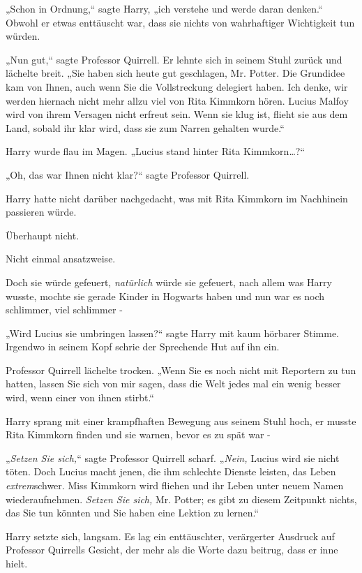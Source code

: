 {„Schon in Ordnung,“ sagte Harry, „ich verstehe und werde daran denken.“ Obwohl er etwas enttäuscht war, dass sie nichts von wahrhaftiger Wichtigkeit tun würden.

„Nun gut,“ sagte Professor Quirrell. Er lehnte sich in seinem Stuhl zurück und lächelte breit. „Sie haben sich heute gut geschlagen, Mr. Potter. Die Grundidee kam von Ihnen, auch wenn Sie die Vollstreckung delegiert haben. Ich denke, wir werden hiernach nicht mehr allzu viel von Rita Kimmkorn hören. Lucius Malfoy wird von ihrem Versagen nicht erfreut sein. Wenn sie klug ist, flieht sie aus dem Land, sobald ihr klar wird, dass sie zum Narren gehalten wurde.“

Harry wurde flau im Magen. „Lucius stand hinter Rita Kimmkorn…?“

„Oh, das war Ihnen nicht klar?“ sagte Professor Quirrell.

Harry hatte nicht darüber nachgedacht, was mit Rita Kimmkorn im Nachhinein passieren würde.

Überhaupt nicht.

Nicht einmal ansatzweise.

Doch sie würde gefeuert, \emph{natürlich} würde sie gefeuert, nach allem was Harry wusste, mochte sie gerade Kinder in Hogwarts haben und nun war es noch schlimmer, viel schlimmer -

„Wird Lucius sie umbringen lassen?“ sagte Harry mit kaum hörbarer Stimme. Irgendwo in seinem Kopf schrie der Sprechende Hut auf ihn ein.

Professor Quirrell lächelte trocken. „Wenn Sie es noch nicht mit Reportern zu tun hatten, lassen Sie sich von mir sagen, dass die Welt jedes mal ein wenig besser wird, wenn einer von ihnen stirbt.“

Harry sprang mit einer krampfhaften Bewegung aus seinem Stuhl hoch, er musste Rita Kimmkorn finden und sie warnen, bevor es zu spät war -

„\emph{Setzen Sie sich,}“ sagte Professor Quirrell scharf. „\emph{Nein,} Lucius wird sie nicht töten. Doch Lucius macht jenen, die ihm schlechte Dienste leisten, das Leben \emph{extrem}schwer. Miss Kimmkorn wird fliehen und ihr Leben unter neuem Namen wiederaufnehmen. \emph{Setzen Sie sich,} Mr. Potter; es gibt zu diesem Zeitpunkt nichts, das Sie tun könnten und Sie haben eine Lektion zu lernen.“

Harry setzte sich, langsam. Es lag ein enttäuschter, verärgerter Ausdruck auf Professor Quirrells Gesicht, der mehr als die Worte dazu beitrug, dass er inne hielt.

}
